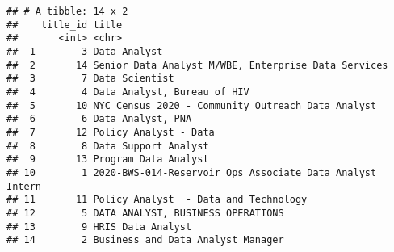 \documentclass[]{article}
\newenvironment{Shaded}{\begin{snugshade}}{\end{snugshade}}
\newcommand{\KeywordTok}[1]{\textcolor[rgb]{0.13,0.29,0.53}{\textbf{#1}}}
\newcommand{\NormalTok}[1]{#1}
\newcommand{\OperatorTok}[1]{\textcolor[rgb]{0.81,0.36,0.00}{\textbf{#1}}}
\newcommand{\StringTok}[1]{\textcolor[rgb]{0.31,0.60,0.02}{#1}}
\begin{document}
\begin{Shaded}
\end{Shaded}

\begin{verbatim}
## # A tibble: 14 x 2
##    title_id title                                                   
##       <int> <chr>                                                   
##  1        3 Data Analyst                                            
##  2       14 Senior Data Analyst M/WBE, Enterprise Data Services     
##  3        7 Data Scientist                                          
##  4        4 Data Analyst, Bureau of HIV                             
##  5       10 NYC Census 2020 - Community Outreach Data Analyst       
##  6        6 Data Analyst, PNA                                       
##  7       12 Policy Analyst - Data                                   
##  8        8 Data Support Analyst                                    
##  9       13 Program Data Analyst                                    
## 10        1 2020-BWS-014-Reservoir Ops Associate Data Analyst Intern
## 11       11 Policy Analyst  - Data and Technology                   
## 12        5 DATA ANALYST, BUSINESS OPERATIONS                       
## 13        9 HRIS Data Analyst                                       
## 14        2 Business and Data Analyst Manager
\end{verbatim}

\begin{Shaded}
\end{Shaded}
\end{document}
